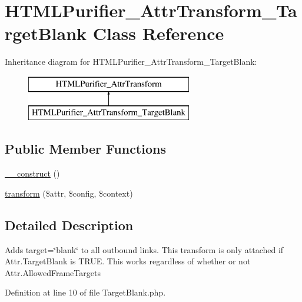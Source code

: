 \hypertarget{classHTMLPurifier__AttrTransform__TargetBlank}{\section{H\+T\+M\+L\+Purifier\+\_\+\+Attr\+Transform\+\_\+\+Target\+Blank Class Reference}
\label{classHTMLPurifier__AttrTransform__TargetBlank}
}
Inheritance diagram for H\+T\+M\+L\+Purifier\+\_\+\+Attr\+Transform\+\_\+\+Target\+Blank\+:\begin{figure}[H]
\begin{center}
\leavevmode
\includegraphics[height=2.000000cm]{classHTMLPurifier__AttrTransform__TargetBlank}
\end{center}
\end{figure}
\subsection*{Public Member Functions}
\begin{DoxyCompactItemize}
\item 
\hyperlink{classHTMLPurifier__AttrTransform__TargetBlank_a4cf53b38c0a5821bcdfd18320383900f}{\+\_\+\+\_\+construct} ()
\item 
\hyperlink{classHTMLPurifier__AttrTransform__TargetBlank_a51b1f11796cd3508be1706d93b6f3b5c}{transform} (\$attr, \$config, \$context)
\end{DoxyCompactItemize}


\subsection{Detailed Description}
Adds target=\char`\"{}blank\char`\"{} to all outbound links. This transform is only attached if Attr.\+Target\+Blank is T\+R\+U\+E. This works regardless of whether or not Attr.\+Allowed\+Frame\+Targets 

Definition at line 10 of file Target\+Blank.\+php.



